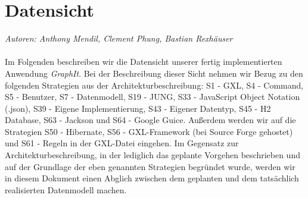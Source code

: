 \documentclass[enabledeprecatedfontcommands,fontsize=11pt,paper=a4,twoside]{scrartcl}
\renewcommand{\headrulewidth}{0pt}
\begin{document}
  \thispagestyle{fancy}
  \fancyhead{}
  \fancyfoot{}
  \renewcommand{\headrulewidth}{0.4pt}
  \tableofcontents

\newpage



\newpage
\section{Datensicht}
\label{sec:datensicht}

\emph{Autoren: Anthony Mendil, Clement Phung, Bastian Rexhäuser}\\ \\

Im Folgenden beschreiben wir die Datensicht unserer fertig implementierten Anwendung \textit{GraphIt}. Bei der Beschreibung dieser Sicht nehmen wir Bezug zu den folgenden Strategien aus der Architekturbeschreibung: S1 - GXL, S4 - Command, S5 - Benutzer, S7 - Datenmodell, S19 - JUNG, S33 - JavaScript Object Notation (.json), S39 - Eigene Implementierung, S43 - Eigener Datentyp, S45 - H2 Database, S63 - Jackson und S64 - Google Guice. Außerdem werden wir auf die Strategien S50 - Hibernate, S56 - GXL-Framework (bei Source Forge gehostet) und S61 - Regeln in der GXL-Datei eingehen. Im Gegensatz zur Architekturbeschreibung, in der lediglich das geplante Vorgehen beschrieben und auf der Grundlage der eben genannten Strategien begründet wurde, werden wir in diesem Dokument einen Abglich zwischen dem geplanten und dem tatsächlich realisierten Datenmodell machen. \\
\end{document}

